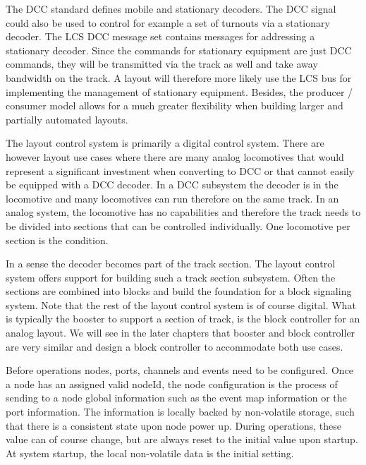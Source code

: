 The DCC standard defines mobile and stationary decoders. The DCC signal could also be used to control for example a set of turnouts via a stationary decoder. The LCS DCC  message set contains messages for addressing a stationary decoder. Since the commands for stationary equipment are just DCC commands, they will be transmitted via the track as well and take away bandwidth on the track. A layout will therefore more likely use the LCS bus for implementing the management of stationary equipment. Besides, the producer / consumer model allows for a much greater flexibility when building larger and partially automated layouts.


The layout control system is primarily a digital control system. There are however layout use cases where there are many analog locomotives that would represent a significant investment when converting to DCC or that cannot easily be equipped with a DCC decoder. In a DCC subsystem the decoder is in the locomotive and many locomotives can run therefore on the same track. In an analog system, the locomotive has no capabilities and therefore the track needs to be divided into sections that can be controlled individually. One locomotive per section is the condition. 

\begin{center}
\end{center}

In a sense the decoder becomes part of the track section. The layout control system offers support for building such a track section subsystem. Often the sections are combined into blocks and build the foundation for a block signaling system. Note that the rest of the layout control system is of course digital. What is typically the booster to support a section of track, is the block controller for an analog layout. We will see in the later chapters that booster and block controller are very similar and design a block controller to accommodate both use cases.


Before operations nodes, ports, channels and events need to be configured. Once a node has an assigned valid nodeId, the node configuration is the process of sending to a node global information such as the event map information or the port information. The information is locally backed by non-volatile storage, such that there is a consistent state upon node power up. During operations, these value can of course change, but are always reset to the initial value upon startup. At system startup, the local non-volatile data is the initial setting.

